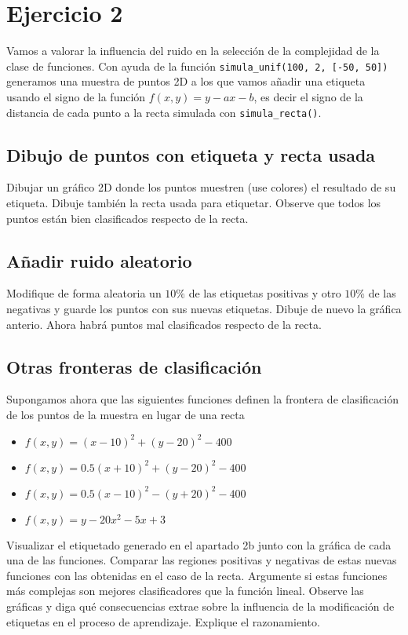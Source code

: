 \section{Ejercicio 2}

Vamos a valorar la influencia del ruido en la selección de la complejidad de la
clase de funciones.  Con ayuda de la función
\texttt{simula_unif(100, 2, [-50, 50])} generamos una muestra de
puntos 2D a los que vamos añadir una etiqueta usando el signo de la función 
$f(x, y) = y - ax - b$, es decir el signo de la distancia de cada punto a la
recta simulada con \texttt{simula_recta()}.  

\subsection{Dibujo de puntos con etiqueta y recta usada}

Dibujar un gráfico 2D donde los puntos muestren (use colores) el resultado de su
etiqueta. Dibuje también la recta usada para etiquetar. Observe que todos los
puntos están bien clasificados respecto de la recta.

\subsection{Añadir ruido aleatorio}

Modifique de forma aleatoria un $10\%$ de las etiquetas positivas y otro $10\%$
de las negativas y guarde los puntos con sus nuevas etiquetas. Dibuje de nuevo
la gráfica anterio. Ahora habrá puntos mal clasificados respecto de la recta.  


\subsection{Otras fronteras de clasificación}

Supongamos ahora que las siguientes funciones definen la frontera de
clasificación de los puntos de la muestra en lugar de una recta 

\begin{itemize}
\item $f(x,y) = (x - 10)^2 + (y - 20)^2 - 400$
\item $f(x,y) = 0.5(x + 10)^2 + (y - 20)^2 - 400$
\item $f(x,y) = 0.5(x - 10)^2 - (y + 20)^2 - 400$
\item $f(x,y) = y - 20x^2 - 5x + 3$
\end{itemize}

Visualizar el etiquetado generado en el apartado 2b junto con la gráfica de cada
una de las funciones.  Comparar las regiones positivas y negativas de estas
nuevas funciones con las obtenidas en el caso de la recta.  Argumente si estas
funciones más complejas son mejores clasificadores que la función lineal.
Observe las gráficas y diga qué consecuencias extrae sobre la influencia de la
modificación de etiquetas en el proceso de aprendizaje. Explique el
razonamiento. 